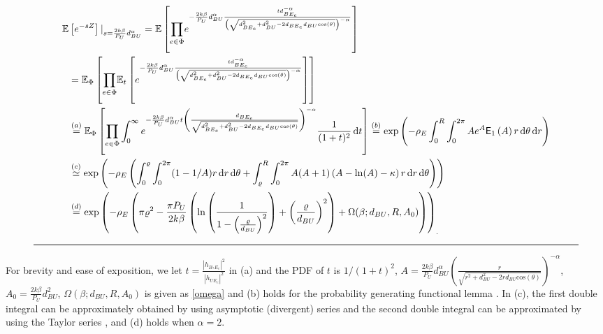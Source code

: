 \documentclass[10pt]{IEEEtran}
\newcommand{\rmd}{\,{\rm d}}
\begin{document}
\begin{figure*}
\begin{equation}\label{27}
\begin{split}
\mathbb{E}&\left[e^{-sZ}\right]|_{s=\frac{2k\beta}{P_U} d^\alpha_{BU}}=\mathbb{E}\left[\underset{e\in \Phi}\prod e^{-\frac{2k\beta}{P_U} d^\alpha_{BU}\frac{td_{BE_e}^{-\alpha}}{\left(\sqrt{d_{BE_e}^2+d_{BU}^2-2d_{BE_e}d_{BU}\textrm{cos}(\theta)}\right)^{-\alpha}}}\right]\\&
= \mathbb{E}_\Phi\left[\underset{e\in \Phi}\prod \mathbb{E}_{t}\left[e^{-\frac{2k\beta}{P_U} d^\alpha_{BU}\frac{td_{BE_e}^{-\alpha}}{\left(\sqrt{d_{BE_e}^2+d_{BU}^2-2d_{BE_e}d_{BU}\textrm{cos}(\theta)}\right)^{-\alpha}}}\right]\right]\\
& \overset{(a)}{=} \mathbb{E}_\Phi\left[\underset{e\in \Phi}\prod \int_0^\infty e^{-\frac{2k\beta}{P_U} d^\alpha_{BU}t\left(\frac{d_{BE_e}}{\sqrt{d_{BE_e}^2+d_{BU}^2-2d_{BE_e}d_{BU}\textrm{cos}(\theta)}}\right)^{-\alpha}}\frac{1}{(1+t)^2}\rmd t\right]
\overset{(b)}{=} \textrm{exp}\left(-\rho_E\int_0^{R}\int_0^{2\pi}Ae^{A}\mathsf{E}_1\left(A\right)r\rmd \theta \rmd r\right)\\ & \overset{(c)}{\simeq} \textrm{exp}\left(-\rho_E\left(\int_0^{\varrho}\int_0^{2\pi}(1-1/A)r\rmd r\rmd\theta+\int_\varrho^{R}\int_0^{2\pi}A(A+1)\left(A-\ln (A)-\kappa\right)r\rmd r\rmd\theta\right)\right)\\ &\overset{(d)}{=} \textrm{exp}\left(-\rho_E\left(\pi\varrho^2-\frac{\pi P_U}{2k\beta}\left(\ln \left(\frac{1}{1-\left(\frac{\varrho}{d_{BU}}\right)^2}\right)+\left(\frac{\varrho}{d_{BU}}\right)^2\right)+\Omega(\beta;d_{BU},R,A_0) \right) \right)_.
\end{split}
\end{equation}
\hrule
\end{figure*}
For brevity and ease of exposition, we let $t = \frac{|h_{B_*E_e}|^2}{|h_{UE_e}|^2}$ in (a) and the PDF of $t$ is $1/(1+t)^2$, $A=\frac{2k\beta}{P_U} d^\alpha_{BU}\left(\frac{r}{\sqrt{r^2+d_{BU}^2-2rd_{BU}\textrm{cos}(\theta)}}\right)^{-\alpha}$, $A_0 = \frac{2k\beta}{P_U} d^2_{BU}$, $\Omega(\beta;d_{BU},R,A_0)$ is given as \eqref{omega} and (b) holds for the probability generating functional lemma \cite{M.H12}. In (c), the first double integral can be approximately obtained by using asymptotic (divergent) series \cite{N.B86} and the second double integral can be approximated by using the Taylor series \cite{C.M78}, and (d) holds when $\alpha = 2$.
\end{document}
